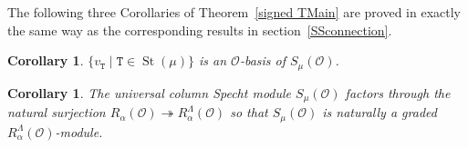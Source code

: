 \documentclass[twoside,11pt,reqno]{amsart}
\numberwithin{equation}{section}
\newtheorem{Corollary}[equation]{Corollary}
\theoremstyle{definition}  %
\def\bi{\text{\boldmath$i$}}
\newcommand{\St}{\operatorname{St}}
\newcommand{\Z}{\mathbb{Z}}
\newcommand{\0}{{\bar 0}}
\newcommand{\1}{{\bar 1}}
\newcommand{\La}{\Lambda}
\newcommand{\al}{\alpha}
\newcommand{\C}{{\mathbb C}}
\newcommand\Par[1][]{{\mathscr P}^{\kappa#1}}
\def\T{{\mathtt T}}
\def\onto{{\twoheadrightarrow}}
\def\into{{\hookrightarrow}}
\renewcommand\O{\mathcal O}
\begin{document}
The following three Corollaries of Theorem~\ref{signed TMain} are proved in exactly the same way as the corresponding
results in section~\ref{SSconnection}.


\begin{Corollary} \label{signed COBasis}%
$\{v_\T\mid \T\in\St(\mu)\}$ 
is an $\O$-basis of %
$S_\mu(\O)$. 
\end{Corollary}



\begin{Corollary} %
The universal column Specht module $S_\mu(\O)$ factors through the natural surjection $R_\al(\O)\onto  R_\al^\La(\O)$ so that $S_\mu(\O)$ is naturally a graded  $R_\al^\La(\O)$-module. 
\end{Corollary}
%
\end{document}
